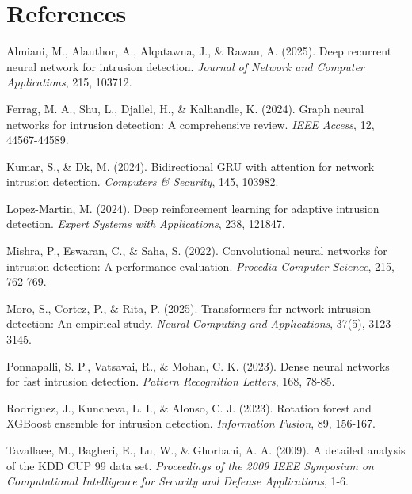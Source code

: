 \documentclass[12pt,a4paper]{report}
\begin{document}
\chapter*{References}

\begin{enumerate}[label={[\arabic*]}, leftmargin=*, itemsep=0.5em]

\item Almiani, M., Alauthor, A., Alqatawna, J., \& Rawan, A. (2025). Deep recurrent neural network for intrusion detection. \textit{Journal of Network and Computer Applications}, 215, 103712.

\item Ferrag, M. A., Shu, L., Djallel, H., \& Kalhandle, K. (2024). Graph neural networks for intrusion detection: A comprehensive review. \textit{IEEE Access}, 12, 44567-44589.

\item Kumar, S., \& Dk, M. (2024). Bidirectional GRU with attention for network intrusion detection. \textit{Computers \& Security}, 145, 103982.

\item Lopez-Martin, M. (2024). Deep reinforcement learning for adaptive intrusion detection. \textit{Expert Systems with Applications}, 238, 121847.

\item Mishra, P., Eswaran, C., \& Saha, S. (2022). Convolutional neural networks for intrusion detection: A performance evaluation. \textit{Procedia Computer Science}, 215, 762-769.

\item Moro, S., Cortez, P., \& Rita, P. (2025). Transformers for network intrusion detection: An empirical study. \textit{Neural Computing and Applications}, 37(5), 3123-3145.

\item Ponnapalli, S. P., Vatsavai, R., \& Mohan, C. K. (2023). Dense neural networks for fast intrusion detection. \textit{Pattern Recognition Letters}, 168, 78-85.

\item Rodriguez, J., Kuncheva, L. I., \& Alonso, C. J. (2023). Rotation forest and XGBoost ensemble for intrusion detection. \textit{Information Fusion}, 89, 156-167.

\item Tavallaee, M., Bagheri, E., Lu, W., \& Ghorbani, A. A. (2009). A detailed analysis of the KDD CUP 99 data set. \textit{Proceedings of the 2009 IEEE Symposium on Computational Intelligence for Security and Defense Applications}, 1-6.


\end{enumerate}
\end{document}

